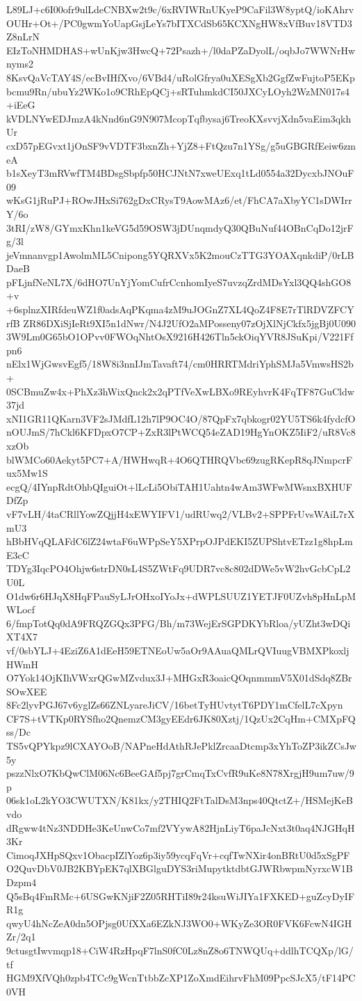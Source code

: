 L89LJ+c6I00ofr9ulLdeCNBXw2t9c/6xRVIWRnUKyeP9CaFil3W8yptQ/ioKAhrv
OUHr+Ot+/PC0gwmYoUapGsjLeYs7bITXCdSb65KCXNgHW8xVfBuv18VTD3Z8nLrN
EIzToNHMDHAS+wUnKjw3HwcQ+72Psazh+/l0daPZaDyolL/oqbJo7WWNrHwnyms2
8KsvQaVcTAY4S/ecBvIHfXvo/6VBd4/uRolGfrya0uXESgXb2GgfZwFujtoP5EKp
bcmu9Rn/ubuYz2WKo1o9CRhEpQCj+sRTuhmkdCI50JXCyLOyh2WzMN017s4+iEeG
kVDLNYwEDJmzA4kNnd6nG9N907McopTqfbysaj6TreoKXsvvjXdn5vaEim3qkhUr
cxD57pEGvxt1jOnSF9vVDTF3bxnZh+YjZ8+FtQzu7n1YSg/g5uGBGRfEeiw6zmeA
b1sXeyT3mRVwfTM4BDsgSbpfp50HCJNtN7xweUExq1tLd0554a32DycxbJNOuF09
wKsG1jRuPJ+ROwJHxSi762gDxCRysT9AowMAz6/et/FhCA7aXbyYC1sDWIrrY/6o
3tRI/zW8/GYmxKhn1keVG5d59OSW3jDUnqmdyQ30QBuNuf44OBnCqDo12jrFg/3l
jeVmnanvgp1AwolmML5Cnipong5YQRXVx5K2mouCzTTG3YOAXqnkdiP/0rLBDaeB
pFLjnfNeNL7X/6dHO7UnYjYomCufrCcnhomIyeS7uvzqZrdMDsYxl3QQ4shGO8+v
+6splnzXIRfdeuWZ1f0adsAqPKqma4zM9uJOGnZ7XL4QoZ4F8E7rTlRDVZFCYrfB
ZR86DXiSjIeRt9XI5n1dNwr/N4J2UfO2aMPosseny07zOjXlNjCkfx5jgBj0U090
3W9Lm0G65bO1OPvv0FWOqNhtOsX9216H426Tln5ckOiqYVR8JSuKpi/V221Ffpn6
nElx1WjGwsvEgf5/18W8i3nnIJmTavaft74/cm0HRRTMdriYphSMJa5VmwsHS2b+
0SCBmuZw4x+PhXz3hWixQnck2x2qPTfVeXwLBXo9REyhvrK4FqTF87GuCldw37jd
xNI1GR11QKarn3VF2sJMdfL12h7lP9OC4O/87QpFx7qbkogr02YU5TS6k4fydcfO
nOUJmS/7hCkl6KFDpxO7CP+ZxR3lPtWCQ54eZAD19HgYnOKZ5IiF2/uR8Vc8xzOb
blWMCo60Aekyt5PC7+A/HWHwqR+4O6QTHRQVbc69zugRKepR8qJNmpcrFux5Mw1S
ecgQ/4IYnpRdtOhbQIguiOt+lLcLi5ObiTAH1Uahtn4wAm3WFwMWsnxBXHUFDfZp
vF7vLH/4taCRllYowZQjjH4xEWYIFV1/udRUwq2/VLBv2+SPPFrUvsWAiL7rXmU3
hBbHVqQLAFdC6lZ24wtaF6uWPpSeY5XPrpOJPdEKI5ZUPShtvETzz1g8hpLmE3cC
TDYg3IqcPO4Ohjw6strDN0sL4S5ZWtFq9UDR7vc8c802dDWe5vW2hvGcbCpL2U0L
O1dw6r6HJqX8HqFPauSyLJrOHxoIYoJx+dWPLSUUZ1YETJF0UZvh8pHnLpMWLocf
6/fmpTotQq0dA9FRQZGQx3PFG/Bh/m73WejErSGPDKYbRloa/yUZht3wDQiXT4X7
vf/0sbYLJ+4EziZ6A1dEeH59ETNEoUw5aOr9AAuaQMLrQVIuugVBMXPkoxljHWmH
O7Yok14OjKIhVWxrQGwMZvdux3J+MHGxR3oaicQOqnmmmV5X01dSdq8ZBrSOwXEE
8Fc2lyvPGJ67v6yglZs66ZNLyareJiCV/16betTyHUvtytT6PDY1mCfelL7cXpyn
CF7S+tVTKp0RYSfho2QnemzCM3gyEEdr6JK80Xztj/1QzUx2CqHm+CMXpFQss/Dc
TS5vQPYkpz9lCXAYOoB/NAPneHdAthRJePklZrcaaDtcmp3xYhToZP3ikZCsJw5y
pszzNlxO7KbQwClM06Nc6BeeGAf5pj7grCmqTxCvfR9uKe8N78XrgjH9um7uw/9p
06sk1oL2kYO3CWUTXN/K81kx/y2THIQ2FtTalDsM3nps40QtctZ+/HSMejKeBvdo
dRgww4tNz3NDDHe3KeUnwCo7mf2VYywA82HjnLiyT6paJcNxt3t0aq4NJGHqH3Kr
CimoqJXHpSQxv1ObacpIZlYoz6p3iy59ycqFqVr+cqfTwNXir4onBRtU0d5xSgPF
O2QuvDbV0JB2KBYpEK7qlXBGlguDYS3riMupytktdbtGJWRbwpmNyrxcW1BDzpm4
Q5sBq4FmRMc+6USGwKNjiF2Z05RHTiI89r24ksuWiJIYa1FXKED+guZcyDyIFR1g
qwyU4hNcZeA0dn5OPjsg0UfXXa6EZkNJ3WO0+WKyZe3OR0FVK6FcwN4IGHZr/2q1
9ctusgtIwvmqp18+CiW4RzHpqF7lnS0fC0Lz8nZ8o6TNWQUq+ddlhTCQXp/lG/tf
HGM9XfVQh0zpb4TCc9gWcnTtbbZcXP1ZoXmdEihrvFhM09PpcSJcX5/tF14PC0VH

